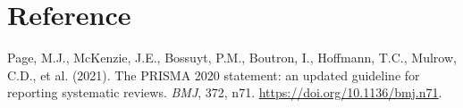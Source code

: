 \documentclass[10pt]{article}
\begin{document}
\section*{Reference}
Page, M.J., McKenzie, J.E., Bossuyt, P.M., Boutron, I., Hoffmann, T.C., Mulrow, C.D., et al. (2021). The PRISMA 2020 statement: an updated guideline for reporting systematic reviews. \textit{BMJ}, 372, n71. \url{https://doi.org/10.1136/bmj.n71}.
\end{document}

